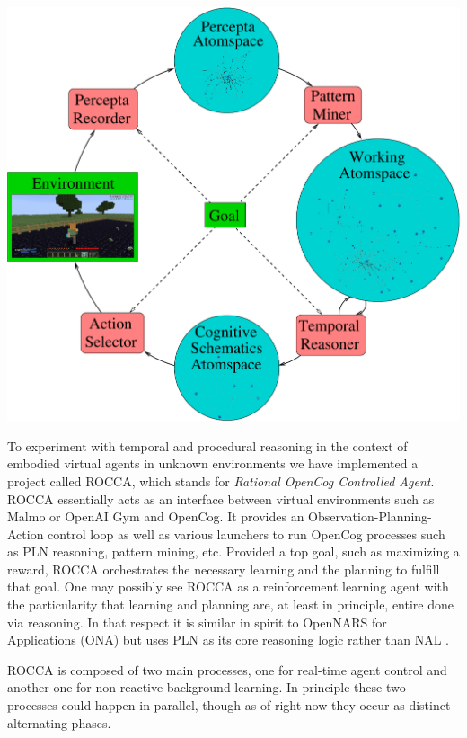 \documentclass[runningheads]{llncs}
\begin{document}
\includegraphics[width=1\textwidth]{pictures/rocca-chart-v0.6.pdf}

To experiment with temporal and procedural reasoning in the context of
embodied virtual agents in unknown environments we have implemented a
project called ROCCA, which stands for \emph{Rational OpenCog
Controlled Agent}.  ROCCA essentially acts as an interface between
virtual environments such as Malmo \cite{TODO} or OpenAI Gym
\cite{TODO} and OpenCog.  It provides an Observation-Planning-Action
control loop as well as various launchers to run OpenCog processes
such as PLN reasoning, pattern mining, etc.
Provided a top goal, such as maximizing a reward, ROCCA orchestrates
the necessary learning and the planning to fulfill that goal.
One may possibly see ROCCA as a reinforcement learning agent with the
particularity that learning and planning are, at least in principle,
entire done via reasoning.  In that respect it is similar in spirit to
OpenNARS for Applications (ONA) \cite{TODO} but uses PLN as its core
reasoning logic rather than NAL \cite{TODO}.

ROCCA is composed of two main processes, one for real-time agent
control and another one for non-reactive background learning.  In
principle these two processes could happen in parallel, though as of
right now they occur as distinct alternating phases.
\end{document}
